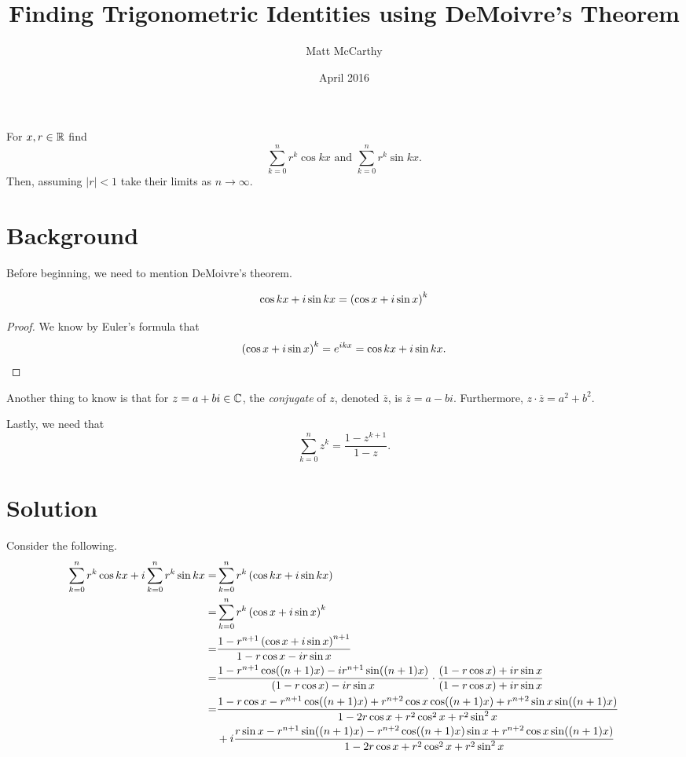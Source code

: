 \documentclass[notitlepage]{simple}
\author{Matt McCarthy}
\title{Finding Trigonometric Identities using DeMoivre's Theorem}
\date{April 2016}
\begin{document}
\maketitle

\begin{problem*}
	For $x,r\in\mathbb{R}$ find
	\[
		\sum_{k=0}^n r^k\cos kx \text{ and } \sum_{k=0}^n r^k\sin kx.
	\]
	Then, assuming $|r|<1$ take their limits as $n\rightarrow\infty$.
\end{problem*}

\section{Background}

Before beginning, we need to mention DeMoivre's theorem.
\begin{thm}
	\[
		\cos kx + i\sin kx = \left( \cos x+i\sin x \right)^k
	\]
\end{thm}
\begin{proof}
	We know by Euler's formula that
	\[
		\left( \cos x+i\sin x \right)^k = e^{ikx} = \cos kx +i\sin kx.
	\]
\end{proof}

Another thing to know is that for $z=a+bi\in\mathbb{C}$, the \textit{conjugate} of $z$, denoted $\overline{z}$, is $\overline{z}=a-bi$.
Furthermore, $z\cdot\overline{z}=a^2+b^2$.

Lastly, we need that
\[
	\sum_{k=0}^n z^k = \frac{1-z^{k+1}}{1-z}.
\]

\section{Solution}

Consider the following.
\begin{align*}
	\sum_{k=0}^n r^k\cos kx + i\sum_{k=0}^n r^k\sin kx =& \sum_{k=0}^n r^k \left( \cos kx + i\sin kx \right)\\
	=& \sum_{k=0}^n r^k \left( \cos x + i\sin x \right)^k\\
	=& \frac{1-r^{n+1}\left( \cos x + i\sin x \right)^{n+1}}{1-r\cos x -ir\sin x}\\
	=& \frac{1-r^{n+1}\cos((n+1)x) -ir^{n+1}\sin((n+1)x)}{(1-r\cos x) -ir\sin x}\cdot\frac{(1-r\cos x)+ir\sin x}{(1-r\cos x) +ir\sin x}\\
	=& \frac{1-r\cos x-r^{n+1}\cos((n+1)x)+r^{n+2}\cos x\cos((n+1)x)+r^{n+2}\sin x\sin((n+1)x)}{1-2r\cos x +r^2\cos^2 x+r^2\sin^2 x}\\
	&+i\frac{r\sin x -r^{n+1}\sin((n+1)x)-r^{n+2}\cos((n+1)x)\sin x +r^{n+2}\cos x\sin((n+1)x)}{1-2r\cos x +r^2\cos^2 x+r^2\sin^2 x}
\end{align*}
\end{document}
